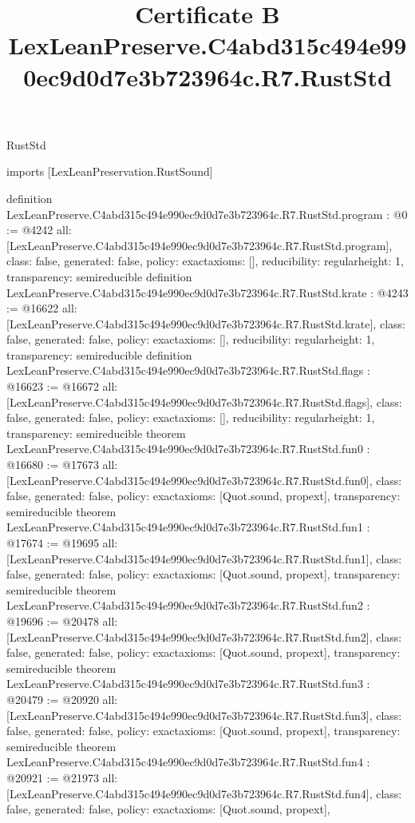 \begin{lexlean}{RustStd}
\title{Certificate B LexLeanPreserve.C4abd315c494e990ec9d0d7e3b723964c.R7.RustStd}
\begin{coremodule}
imports [LexLeanPreservation.RustSound]

definition LexLeanPreserve.C4abd315c494e990ec9d0d7e3b723964c.R7.RustStd.program : @0 := @4242 {
  all: [LexLeanPreserve.C4abd315c494e990ec9d0d7e3b723964c.R7.RustStd.program],
  class: false,
  generated: false,
  policy: exact{axioms: []},
  reducibility: regular{height: 1},
  transparency: semireducible
}
definition LexLeanPreserve.C4abd315c494e990ec9d0d7e3b723964c.R7.RustStd.krate : @4243 := @16622 {
  all: [LexLeanPreserve.C4abd315c494e990ec9d0d7e3b723964c.R7.RustStd.krate],
  class: false,
  generated: false,
  policy: exact{axioms: []},
  reducibility: regular{height: 1},
  transparency: semireducible
}
definition LexLeanPreserve.C4abd315c494e990ec9d0d7e3b723964c.R7.RustStd.flags : @16623 := @16672 {
  all: [LexLeanPreserve.C4abd315c494e990ec9d0d7e3b723964c.R7.RustStd.flags],
  class: false,
  generated: false,
  policy: exact{axioms: []},
  reducibility: regular{height: 1},
  transparency: semireducible
}
theorem LexLeanPreserve.C4abd315c494e990ec9d0d7e3b723964c.R7.RustStd.fun0 : @16680 := @17673 {
  all: [LexLeanPreserve.C4abd315c494e990ec9d0d7e3b723964c.R7.RustStd.fun0],
  class: false,
  generated: false,
  policy: exact{axioms: [Quot.sound, propext]},
  transparency: semireducible
}
theorem LexLeanPreserve.C4abd315c494e990ec9d0d7e3b723964c.R7.RustStd.fun1 : @17674 := @19695 {
  all: [LexLeanPreserve.C4abd315c494e990ec9d0d7e3b723964c.R7.RustStd.fun1],
  class: false,
  generated: false,
  policy: exact{axioms: [Quot.sound, propext]},
  transparency: semireducible
}
theorem LexLeanPreserve.C4abd315c494e990ec9d0d7e3b723964c.R7.RustStd.fun2 : @19696 := @20478 {
  all: [LexLeanPreserve.C4abd315c494e990ec9d0d7e3b723964c.R7.RustStd.fun2],
  class: false,
  generated: false,
  policy: exact{axioms: [Quot.sound, propext]},
  transparency: semireducible
}
theorem LexLeanPreserve.C4abd315c494e990ec9d0d7e3b723964c.R7.RustStd.fun3 : @20479 := @20920 {
  all: [LexLeanPreserve.C4abd315c494e990ec9d0d7e3b723964c.R7.RustStd.fun3],
  class: false,
  generated: false,
  policy: exact{axioms: [Quot.sound, propext]},
  transparency: semireducible
}
theorem LexLeanPreserve.C4abd315c494e990ec9d0d7e3b723964c.R7.RustStd.fun4 : @20921 := @21973 {
  all: [LexLeanPreserve.C4abd315c494e990ec9d0d7e3b723964c.R7.RustStd.fun4],
  class: false,
  generated: false,
  policy: exact{axioms: [Quot.sound, propext]},
}
\end{coremodule}
\end{lexlean}
